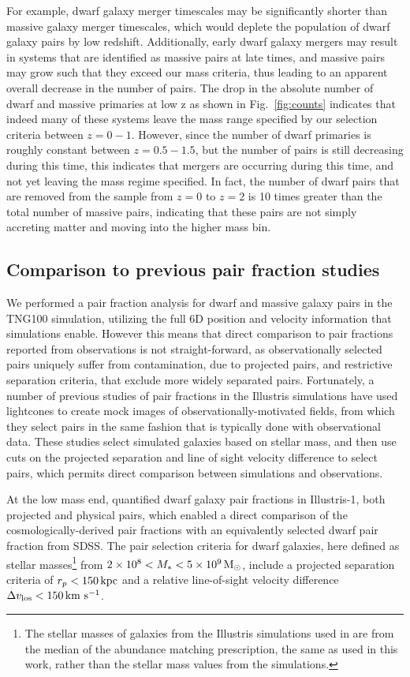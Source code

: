 \documentclass[twocolumn]{aastex631}
\begin{document}
For example, dwarf galaxy merger timescales may be significantly shorter than massive galaxy merger timescales, which would deplete the population of dwarf galaxy pairs by low redshift. 
Additionally, early dwarf galaxy mergers may result in systems that are identified as massive pairs at late times, and massive pairs may grow such that they exceed our mass criteria, thus leading to an apparent overall decrease in the number of pairs. 
The drop in the absolute number of dwarf and massive primaries at low z as shown in Fig.~\ref{fig:counts} indicates that indeed many of these systems leave the mass range specified by our selection criteria between $z=0-1$. 
However, since the number of dwarf primaries is roughly constant between $z=0.5-1.5$, but the number of pairs is still decreasing during this time, this indicates that mergers are occurring during this time, and not yet leaving the mass regime specified. 
In fact, the number of dwarf pairs that are removed from the sample from $z=0$ to $z=2$ is 10 times greater than the total number of massive pairs, indicating that these pairs are not simply accreting matter and moving into the higher mass bin.





\subsection{Comparison to previous pair fraction studies}
We performed a pair fraction analysis for dwarf and massive galaxy pairs in the TNG100 simulation, utilizing the full 6D position and velocity information that simulations enable. 
However this means that direct comparison to pair fractions reported from observations is not straight-forward, as observationally selected pairs uniquely suffer from contamination, due to projected pairs, and restrictive separation criteria, that exclude more widely separated pairs. 
Fortunately, a number of previous studies of pair fractions in the Illustris simulations have used lightcones to create mock images of observationally-motivated fields, from which they select pairs in the same fashion that is typically done with observational data.
These studies select simulated galaxies based on stellar mass, and then use cuts on the projected separation and line of sight velocity difference to select pairs, which permits direct comparison between simulations and observations. 

At the low mass end, \citet{Besla2018} quantified dwarf galaxy pair fractions in Illustris-1, both projected and physical pairs, which enabled a direct comparison of the cosmologically-derived pair fractions with an equivalently selected dwarf pair fraction from SDSS.  
The pair selection criteria for dwarf galaxies, here defined as stellar masses\footnote{The stellar masses of galaxies from the Illustris simulations used in \citet{Besla2018} are from the median of the \citet{Moster2013} abundance matching prescription, the same as used in this work, rather than the stellar mass values from the simulations.} from $2\times10^{8} < M_{*} < 5\times10^{9}\,\mathrm{M}_\odot$, include a projected separation criteria of $r_{p} < 150\,\mathrm{kpc}$ and a relative line-of-sight velocity difference $\Delta v_{\rm los} < 150\,\mathrm{km}~\mathrm{s}^{-1}$. 
\end{document}
